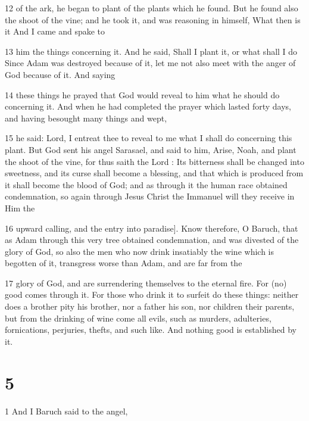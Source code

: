 \par 12 of the ark, he began to plant of the plants which he found. But he found also the shoot of the vine; and he took it, and was reasoning in himself, What then is it And I came and spake to

\par 13 him the things concerning it. And he said, Shall I plant it, or what shall I do Since Adam was destroyed because of it, let me not also meet with the anger of God because of it. And saying

\par 14 these things he prayed that God would reveal to him what he should do concerning it. And when he had completed the prayer which lasted forty days, and having besought many things and wept,

\par 15 he said: Lord, I entreat thee to reveal to me what I shall do concerning this plant. But God sent his angel Sarasael, and said to him, Arise, Noah, and plant the shoot of the vine, for thus saith the Lord : Its bitterness shall be changed into sweetness, and its curse shall become a blessing, and that which is produced from it shall become the blood of God; and as through it the human race obtained condemnation, so again through Jesus Christ the Immanuel will they receive in Him the

\par 16 upward calling, and the entry into paradise]. Know therefore, O Baruch, that as Adam through this very tree obtained condemnation, and was divested of the glory of God, so also the men who now drink insatiably the wine which is begotten of it, transgress worse than Adam, and are far from the

\par 17 glory of God, and are surrendering themselves to the eternal fire. For (no) good comes through it. For those who drink it to surfeit do these things: neither does a brother pity his brother, nor a father his son, nor children their parents, but from the drinking of wine come all evils, such as murders, adulteries, fornications, perjuries, thefts, and such like. And nothing good is established by it.

\chapter{5}

\par 1 And I Baruch said to the angel,

